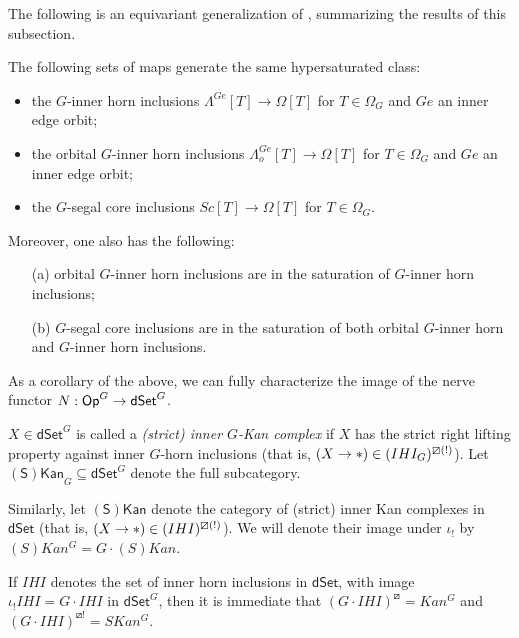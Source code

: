 \documentclass[a4paper,10pt,draft]{article}%
\begin{document}
The following is an equivariant generalization of 
\cite[Props. 2.4 and 2.5]{CM13a},
summarizing the results
of this subsection.

\begin{proposition}
The following sets of maps generate the same hypersaturated class:
\begin{itemize}
\item the $G$-inner horn inclusions
$\Lambda^{Ge} [T] \to \Omega[T]$ for $T \in \Omega_G$ and $Ge$ an inner edge orbit; 
\item the orbital $G$-inner horn inclusions
$\Lambda^{Ge}_o [T] \to \Omega[T]$ for $T \in \Omega_G$ and $Ge$ an inner edge orbit; 
\item the $G$-segal core inclusions
$Sc [T] \to \Omega[T]$ for $T \in \Omega_G$.
\end{itemize}
Moreover, one also has the following:
\begin{itemize}
	\item[(a)] orbital $G$-inner horn inclusions are in the saturation of $G$-inner horn inclusions;
	\item[(b)] $G$-segal core inclusions are in the saturation of both orbital $G$-inner horn and $G$-inner horn inclusions.
\end{itemize}
\end{proposition}


As a corollary of the above, we can fully characterize the image of the nerve functor $N: \mathsf{Op}^G \to \mathsf{dSet}^G$.

\begin{definition}
      $X \in \mathsf{dSet}^G$ is called a \textit{(strict) inner $G$-Kan complex} if
      $X$ has the strict right lifting property against inner $G$-horn inclusions
      (that is, $(X \to \**) \in (IHI_G)^{\boxslash (!)}$).
      Let $\mathsf{(S)Kan}_G \subseteq \mathsf{dSet}^G$ denote the full subcategory.

      Similarly, let $\mathsf{(S)Kan}$ denote the category of
      (strict) inner Kan complexes in $\mathsf{dSet}$
      (that is, $(X \to \**) \in (IHI)^{\boxslash (!)}$).
      We will denote their image under $\iota_!$ by $(S)Kan^G = G \cdot (S)Kan$.
\end{definition}

\begin{remark}
      If $IHI$ denotes the set of inner horn inclusions in $\mathsf{dSet}$,
      with image $\iota_! IHI = G \cdot IHI$ in $\mathsf{dSet}^G$,
      then it is immediate that $(G \cdot IHI)^{\boxslash} = Kan^G$ and $(G \cdot IHI)^{\boxslash !} = SKan^G$.
\end{remark}
\end{document}
